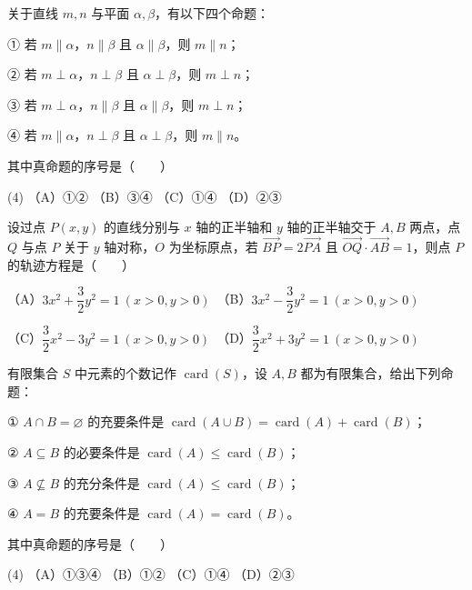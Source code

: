 \begin{question}
关于直线 $m,n$ 与平面 $\alpha,\beta$，有以下四个命题：

① 若 $m\parallel\alpha$，$n\parallel\beta$ 且 $\alpha\parallel\beta$，则 $m\parallel n$；

② 若 $m\perp\alpha$，$n\perp\beta$ 且 $\alpha\perp\beta$，则 $m\perp n$；

③ 若 $m\perp\alpha$，$n\parallel\beta$ 且 $\alpha\parallel\beta$，则 $m\perp n$；

④ 若 $m\parallel\alpha$，$n\perp\beta$ 且 $\alpha\perp\beta$，则 $m\parallel n$。

其中真命题的序号是\mbox{（　　）}

\begin{gkopts}(4)
\task （A）①②
\task （B）③④
\task （C）①④
\task （D）②③
\end{gkopts}

\end{question}
\begin{question}
设过点 $P(x,y)$ 的直线分别与 $x$ 轴的正半轴和 $y$ 轴的正半轴交于 $A,B$ 两点，点 $Q$ 与点 $P$ 关于 $y$ 轴对称，$O$ 为坐标原点，若 $\overrightarrow{BP}=2\overrightarrow{PA}$ 且 $\overrightarrow{OQ}\cdot\overrightarrow{AB}=1$，则点 $P$ 的轨迹方程是\mbox{（　　）}

（A）$3x^2+\dfrac32y^2=1\ (x>0,y>0)$　（B）$3x^2-\dfrac32y^2=1\ (x>0,y>0)$

（C）$\dfrac32x^2-3y^2=1\ (x>0,y>0)$　（D）$\dfrac32x^2+3y^2=1\ (x>0,y>0)$

\end{question}
\begin{question}
有限集合 $S$ 中元素的个数记作 $\operatorname{card}(S)$，设 $A,B$ 都为有限集合，给出下列命题：

① $A\cap B=\varnothing$ 的充要条件是 $\operatorname{card}(A\cup B)=\operatorname{card}(A)+\operatorname{card}(B)$；

② $A\subseteq B$ 的必要条件是 $\operatorname{card}(A)\leqslant\operatorname{card}(B)$；

③ $A\nsubseteq B$ 的充分条件是 $\operatorname{card}(A)\leqslant\operatorname{card}(B)$；

④ $A=B$ 的充要条件是 $\operatorname{card}(A)=\operatorname{card}(B)$。

其中真命题的序号是\mbox{（　　）}

\begin{gkopts}(4)
\task （A）①③④
\task （B）①②
\task （C）①④
\task （D）②③
\end{gkopts}

\end{question}
